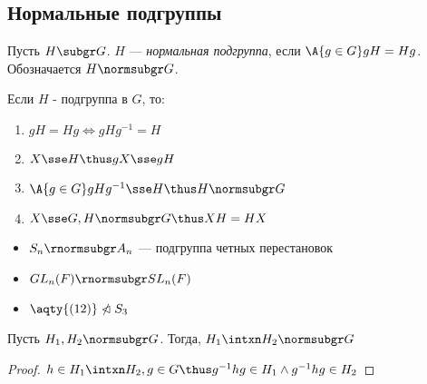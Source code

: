 \subsection{Нормальные подгруппы}
\begin{definition}
  Пусть $H\subgr G$. $H$ --- \emph{нормальная подгруппа}, если $\A{g\in G} gH=Hg$. Обозначается $H\normsubgr G$.
\end{definition}
\begin{remark}
  Если $H$ - подгруппа в $G$, то:
  \begin{enumerate}
    \item $gH=Hg\iff gHg^{-1}=H$
    \item $X\sse H \thus gX\sse gH$
    \item $\A{g\in G} gHg^{-1}\sse H \thus H\normsubgr G$ \label{rem:normsubgr3}
    \item $X\sse G, H\normsubgr G \thus XH=HX$
  \end{enumerate}
\end{remark}
\begin{examples}
  \theoremlistshack
  \begin{itemize}
    \item $S_n \rnormsubgr A_n$ --- подгруппа четных перестановок
    \item $GL_n(F) \rnormsubgr SL_n(F)$
    \item $\aqty{(12)}\ntriangleleft S_3$
  \end{itemize}
\end{examples}

\begin{theorem}
  Пусть $H_1, H_2 \normsubgr G$. Тогда, $H_1\intxn H_2 \normsubgr G$
\end{theorem}
\begin{proof}
  $h\in H_1\intxn H_2, g\in G \thus g^{-1} hg\in H_1 \land g^{-1} hg\in H_2$
\end{proof}

